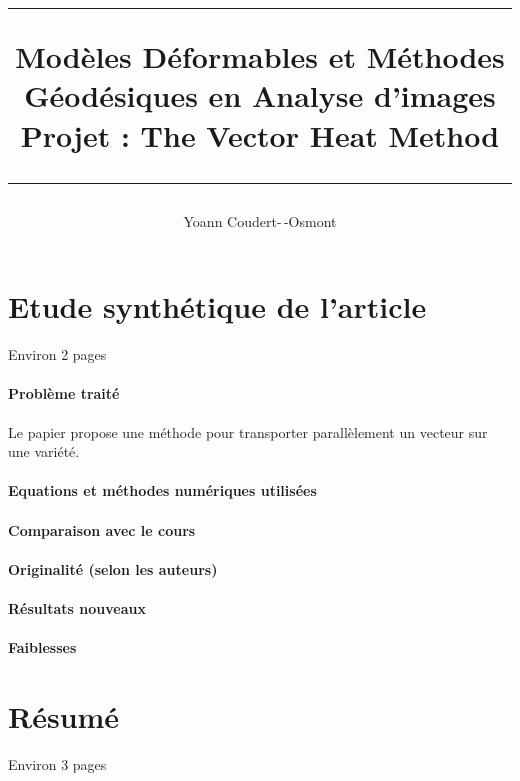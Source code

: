 \documentclass[11pt]{article}
\title{
	\noindent\rule{\linewidth}{0.4pt}
	{ \huge Modèles Déformables et Méthodes Géodésiques en Analyse d’images } \\
	Projet : The Vector Heat Method
	\noindent\rule{\linewidth}{1pt}
}
\author{Yoann Coudert-\,-Osmont}
\begin{document}
	
	\maketitle
	
	\section{Etude synthétique de l'article}
	
	Environ 2 pages
	
	\paragraph{Problème traité}
	Le papier propose une méthode pour transporter parallèlement un vecteur sur une variété.
	
	\paragraph{Equations et méthodes numériques utilisées}
	
	\paragraph{Comparaison avec le cours}
	
	\paragraph{Originalité (selon les auteurs)}
	
	\paragraph{Résultats nouveaux}
	
	\paragraph{Faiblesses}
	
	\section{Résumé}
	
	Environ 3 pages
\end{document}
